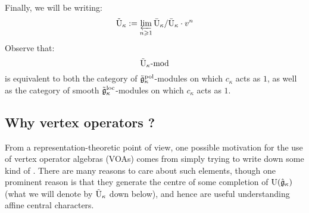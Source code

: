             Finally, we will be writing:
                $$\tilde{\mathrm{U}}_{\kappa} := \varprojlim_{n \geqslant 1} \bar{\mathrm{U}}_{\kappa}/\bar{\mathrm{U}}_{\kappa} \cdot v^n$$
            Observe that:
                $$\tilde{\mathrm{U}}_{\kappa}\text{-}\mathrm{mod}$$
            is equivalent to both the category of $\tilde{\mathfrak{g}}_{\kappa}^{\mathrm{pol}}$-modules on which $c_{\kappa}$ acts as $1$, as well as the category of smooth $\tilde{\mathfrak{g}}_{\kappa}^{\mathrm{loc}}$-modules on which $c_{\kappa}$ acts as $1$.

        \subsection{Why vertex operators ?}
            From a representation-theoretic point of view, one possible motivation for the use of vertex operator algebras (VOAs) comes from simply trying to write down some kind of . There are many reasons to care about such elements, though one prominent reason is that they generate the centre of some completion of $\mathrm{U}(\hat{\mathfrak{g}}_{\kappa})$ (what we will denote by $\tilde{\mathrm{U}}_{\kappa}$ down below), and hence are useful understanding affine central characters. 
            
